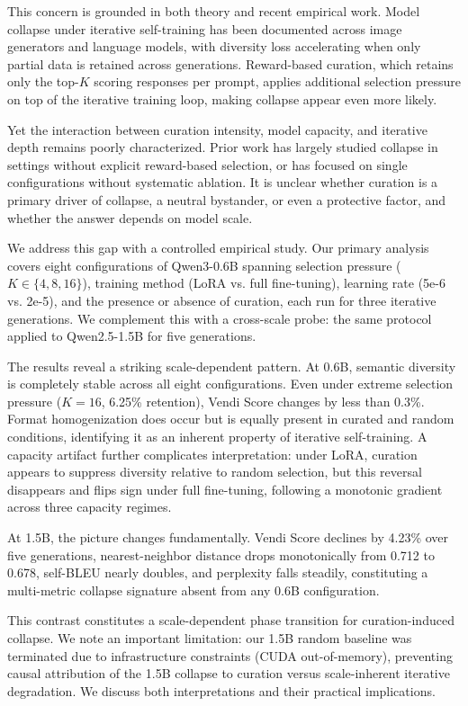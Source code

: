 \documentclass[11pt,a4paper]{article}
\begin{document}
This concern is grounded in both theory and recent empirical work. Model collapse under iterative self-training has been documented across image generators and language models, with diversity loss accelerating when only partial data is retained across generations. Reward-based curation, which retains only the top-$K$ scoring responses per prompt, applies additional selection pressure on top of the iterative training loop, making collapse appear even more likely.

Yet the interaction between curation intensity, model capacity, and iterative depth remains poorly characterized. Prior work has largely studied collapse in settings without explicit reward-based selection, or has focused on single configurations without systematic ablation. It is unclear whether curation is a primary driver of collapse, a neutral bystander, or even a protective factor, and whether the answer depends on model scale.

We address this gap with a controlled empirical study. Our primary analysis covers eight configurations of Qwen3-0.6B spanning selection pressure ($K \in \{4, 8, 16\}$), training method (LoRA vs. full fine-tuning), learning rate (5e-6 vs. 2e-5), and the presence or absence of curation, each run for three iterative generations. We complement this with a cross-scale probe: the same protocol applied to Qwen2.5-1.5B for five generations.

The results reveal a striking scale-dependent pattern. At 0.6B, semantic diversity is completely stable across all eight configurations. Even under extreme selection pressure ($K{=}16$, 6.25\% retention), Vendi Score changes by less than 0.3\%. Format homogenization does occur but is equally present in curated and random conditions, identifying it as an inherent property of iterative self-training. A capacity artifact further complicates interpretation: under LoRA, curation appears to suppress diversity relative to random selection, but this reversal disappears and flips sign under full fine-tuning, following a monotonic gradient across three capacity regimes.

At 1.5B, the picture changes fundamentally. Vendi Score declines by 4.23\% over five generations, nearest-neighbor distance drops monotonically from 0.712 to 0.678, self-BLEU nearly doubles, and perplexity falls steadily, constituting a multi-metric collapse signature absent from any 0.6B configuration.

This contrast constitutes a scale-dependent phase transition for curation-induced collapse. We note an important limitation: our 1.5B random baseline was terminated due to infrastructure constraints (CUDA out-of-memory), preventing causal attribution of the 1.5B collapse to curation versus scale-inherent iterative degradation. We discuss both interpretations and their practical implications.
\end{document}
